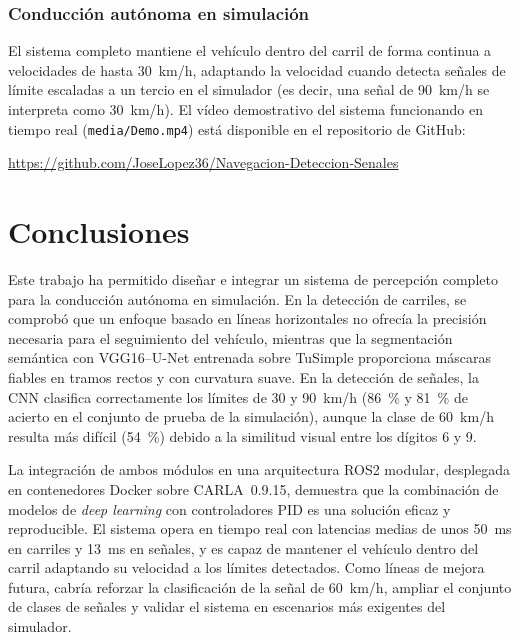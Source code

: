 \documentclass[12pt, a4paper]{article}
\begin{document}
\subsubsection{Conducción autónoma en simulación}

El sistema completo mantiene el vehículo dentro del carril de forma continua a velocidades de hasta 30~km/h, adaptando la velocidad cuando detecta señales de límite escaladas a un tercio en el simulador (es decir, una señal de 90~km/h se interpreta como 30~km/h). El vídeo demostrativo del sistema funcionando en tiempo real (\texttt{media/Demo.mp4}) está disponible en el repositorio de GitHub:
\begin{center}
    \url{https://github.com/JoseLopez36/Navegacion-Deteccion-Senales}
\end{center}

\section{Conclusiones}

Este trabajo ha permitido diseñar e integrar un sistema de percepción completo para la conducción autónoma en simulación. En la detección de carriles, se comprobó que un enfoque basado en líneas horizontales no ofrecía la precisión necesaria para el seguimiento del vehículo, mientras que la segmentación semántica con VGG16--U-Net entrenada sobre TuSimple proporciona máscaras fiables en tramos rectos y con curvatura suave. En la detección de señales, la CNN clasifica correctamente los límites de 30 y 90~km/h (86~\% y 81~\% de acierto en el conjunto de prueba de la simulación), aunque la clase de 60~km/h resulta más difícil (54~\%) debido a la similitud visual entre los dígitos 6 y 9.

La integración de ambos módulos en una arquitectura ROS2 modular, desplegada en contenedores Docker sobre CARLA~0.9.15, demuestra que la combinación de modelos de \textit{deep learning} con controladores PID es una solución eficaz y reproducible. El sistema opera en tiempo real con latencias medias de unos 50~ms en carriles y 13~ms en señales, y es capaz de mantener el vehículo dentro del carril adaptando su velocidad a los límites detectados. Como líneas de mejora futura, cabría reforzar la clasificación de la señal de 60~km/h, ampliar el conjunto de clases de señales y validar el sistema en escenarios más exigentes del simulador.
\end{document}
